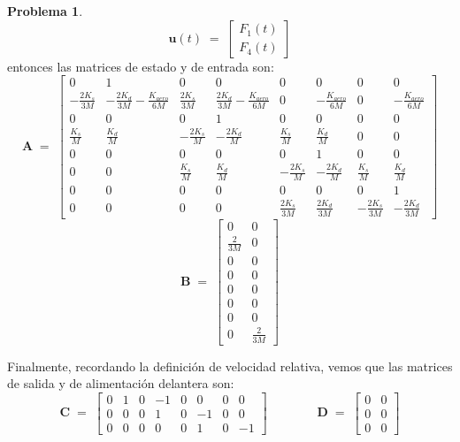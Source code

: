 \documentclass[ a4paper, twoside, 11pt]{article}
\renewcommand{\vec}[1]{{\boldsymbol{#1}}}
\theoremstyle{definition}
\newtheorem{problem}[definition]{Problema}
\begin{document}
\begin{problem}
\[\vec{u}(t) \; = \; 
\left[ \begin{array}{c} F_1(t) \\ F_4(t) \end{array} \right]
\]
entonces las matrices de estado y de entrada son: 
\[
\vec{A} \; = \; 
\left[ \begin{array}{cc|cc|cc|cc}
0 & 1 & 0 & 0 & 0 & 0 & 0 & 0 \\[1ex]
-\frac{2 K_s}{3 M} & -\frac{2 K_d}{3 M} -\frac{K_{aero}}{6M} & \frac{2 K_s}{3 M} & \frac{2 K_d}{3 M} -\frac{K_{aero}}{6M} & 0 & -\frac{K_{aero}}{6 M} & 0 & -\frac{K_{aero}}{6 M} \\[1ex] \hline
0 & 0 & 0 & 1 & 0 & 0 & 0 & 0 \\[1ex]
\frac{K_s}{M} & \frac{K_d}{M} & -\frac{2 K_s}{M} & -\frac{2 K_d}{M} & \frac{K_s}{M} & \frac{K_d}{M} & 0 & 0 \\[1ex] \hline
0 & 0 & 0 & 0 & 0 & 1 & 0 & 0 \\[1ex]
0 & 0 & \frac{K_s}{M} & \frac{K_d}{M} & -\frac{2 K_s}{M} & -\frac{2 K_d}{M} & \frac{K_s}{M} & \frac{K_d}{M} \\[1ex] \hline
0 & 0 & 0 & 0 & 0 & 0 & 0 & 1 \\[1ex]
0 & 0 & 0 & 0 & \frac{2 K_s}{3 M} & \frac{2 K_d}{3 M} & -\frac{2 K_s}{3M} & -\frac{2 K_d}{3M}
\end{array} \right]
\]
\[
\vec{B} \; = \; 
\left[ \begin{array}{c|c}
0 & 0 \\[1ex]
\frac{2}{3M} & 0 \\[1ex] \hline
0 & 0 \\[1ex]
0 & 0 \\[1ex] \hline
0 & 0 \\[1ex]
0 & 0 \\[1ex] \hline
0 & 0 \\[1ex]
0 & \frac{2}{3M}
\end{array} \right]
\]

Finalmente, recordando la definici\'on de velocidad relativa, vemos que las matrices de salida y de alimentaci\'on delantera son: 
\[
\vec{C} \; = \; 
\left[ \begin{array}{cc|cc|cc|cc}
0 & 1 & 0 & -1 & 0 & 0 & 0 & 0 \\ \hline
0 & 0 & 0 & 1 & 0 & -1 & 0 & 0 \\ \hline
0 & 0 & 0 & 0 & 0 & 1 & 0 & -1
\end{array} \right] \qquad \qquad 
\vec{D} \; = \; 
\left[ \begin{array}{c|c}
0 & 0 \\ \hline 0 & 0 \\ \hline 0 & 0
\end{array} \right]
\]

\end{problem}
\vspace{\baselineskip}
\end{document}
